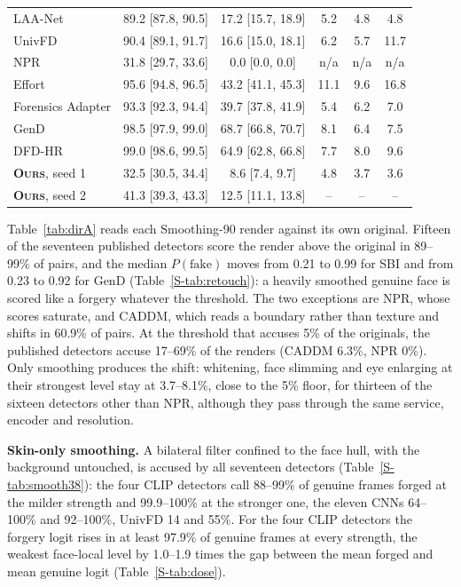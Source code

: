 \documentclass[journal]{IEEEtran}  %
\newcommand{\ours}{\textsc{Ours}}
\begin{document}
\begin{table}[t]
\begin{tabular}{@{}l cc ccc@{}}
LAA-Net & 89.2 [87.8, 90.5] & 17.2 [15.7, 18.9] & 5.2 & 4.8 & 4.8 \\
UnivFD & 90.4 [89.1, 91.7] & 16.6 [15.0, 18.1] & 6.2 & 5.7 & 11.7 \\
NPR & 31.8 [29.7, 33.6] & 0.0 [0.0, 0.0] & n/a & n/a & n/a \\
Effort & 95.6 [94.8, 96.5] & 43.2 [41.1, 45.3] & 11.1 & 9.6 & 16.8 \\
Forensics Adapter & 93.3 [92.3, 94.4] & 39.7 [37.8, 41.9] & 5.4 & 6.2 & 7.0 \\
GenD & 98.5 [97.9, 99.0] & 68.7 [66.8, 70.7] & 8.1 & 6.4 & 7.5 \\
DFD-HR & 99.0 [98.6, 99.5] & 64.9 [62.8, 66.8] & 7.7 & 8.0 & 9.6 \\
\midrule
\textbf{\ours{}}, seed 1 & 32.5 [30.5, 34.4] & 8.6 [7.4, 9.7] & 4.8 & 3.7 & 3.6 \\
\textbf{\ours{}}, seed 2 & 41.3 [39.3, 43.3] & 12.5 [11.1, 13.8] & -- & -- & -- \\
\bottomrule
\end{tabular}
\end{table}

Table~\ref{tab:dirA} reads each Smoothing-90 render against its own original. Fifteen of the seventeen published detectors
score the render above the original in 89--99\% of pairs, and the median $P(\text{fake})$ moves from 0.21 to 0.99 for SBI
and from 0.23 to 0.92 for GenD (Table~\ref{S-tab:retouch}):
a heavily smoothed genuine face is scored like a forgery whatever the threshold. The two exceptions are NPR, whose scores
saturate, and CADDM, which reads a boundary rather than texture and shifts in 60.9\% of pairs. At the threshold that accuses
5\% of the originals, the published detectors accuse 17--69\% of the renders (CADDM 6.3\%, NPR 0\%).
Only smoothing produces the shift: whitening, face slimming and eye enlarging at their strongest level stay at 3.7--8.1\%, close to the 5\% floor, for thirteen of the sixteen detectors other than NPR,
although they pass through the same service, encoder and resolution.

\textbf{Skin-only smoothing.} A bilateral filter confined to the face hull, with the background untouched, is accused by all
seventeen detectors (Table~\ref{S-tab:smooth38}): the four CLIP detectors call 88--99\% of genuine frames forged at the
milder strength and 99.9--100\% at the stronger one, the eleven CNNs 64--100\% and 92--100\%, UnivFD 14 and 55\%.
For the four CLIP detectors the forgery logit rises in at least 97.9\% of genuine frames at every strength, the weakest
face-local level by 1.0--1.9 times the gap between the mean forged and mean genuine logit (Table~\ref{S-tab:dose}).
\end{document}
